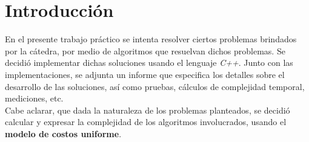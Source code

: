 \section*{Introducción}

En el presente trabajo práctico se intenta resolver ciertos problemas brindados por la c\'atedra, 
por medio de algoritmos que resuelvan dichos problemas. Se decidi\'o implementar dichas soluciones 
usando el lenguaje \textit{C++}. Junto con las implementaciones, se adjunta un 
informe que especifica los detalles sobre el desarrollo de las soluciones, as\'i como pruebas, 
cálculos de complejidad temporal, mediciones, etc.\\
Cabe aclarar, que dada la naturaleza de los problemas planteados, se decidi\'o calcular y 
expresar la complejidad de los algoritmos involucrados, usando el \textbf{modelo de costos uniforme}.
